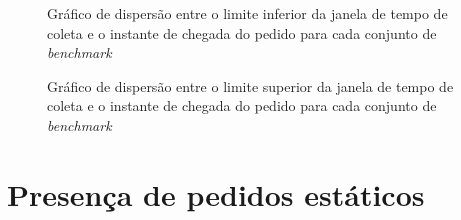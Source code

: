 \begin{figure}[h]
    \centering
    \caption{Gráfico de dispersão entre o limite inferior da janela de tempo
             de coleta e o instante de chegada do pedido para cada conjunto 
             de \textit{benchmark}}
    \label{fig:scatterplot_pickup_lower_tw_x_arrival_time}
\end{figure}

\begin{figure}[h]
    \centering
    \caption{Gráfico de dispersão entre o limite superior da janela de tempo 
             de coleta e o instante de chegada do pedido para cada conjunto 
             de \textit{benchmark}}
    \label{fig:scatterplot_pickup_upper_tw_x_arrival_time}
\end{figure}






\section{Presença de pedidos estáticos}

